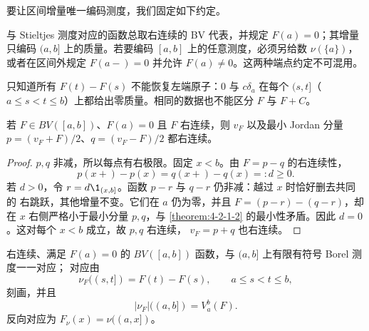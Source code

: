 要让区间增量唯一编码测度，我们固定如下约定。

\begin{definition}[右连续规范与左端原子]\label{def:4-2-1-3}
与 Stieltjes 测度对应的函数总取右连续的 BV 代表，并规定 $F(a)=0$；其增量只编码
$(a,b]$ 上的质量。若要编码 $[a,b]$ 上的任意测度，必须另给数
$\nu(\{a\})$，或者在区间外规定 $F(a-)=0$ 并允许 $F(a)\ne0$。这两种端点约定不可混用。
\end{definition}

只知道所有 $F(t)-F(s)$ 不能恢复左端原子：$0$ 与 $c\delta_a$ 在每个
$(s,t]$（$a\le s<t\le b$）上都给出零质量。相同的数据也不能区分 $F$ 与 $F+C$。

\begin{lemma}[右连续性传给变差函数]\label{lemma:4-2-1-right-variation}
若 $F\in BV([a,b])$、$F(a)=0$ 且 $F$ 右连续，则 $v_F$ 以及最小 Jordan 分量
$p=(v_F+F)/2$、$q=(v_F-F)/2$ 都右连续。
\end{lemma}

\begin{proof}
$p,q$ 非减，所以每点有右极限。固定 $x<b$。由 $F=p-q$ 的右连续性，
\[
 p(x+)-p(x)=q(x+)-q(x)=:d\ge0.
\]
若 $d>0$，令 $r=d\1_{(x,b]}$。函数 $p-r$ 与 $q-r$ 仍非减：越过 $x$ 时恰好删去共同的
右跳跃，其他增量不变。它们在 $a$ 仍为零，并且
$F=(p-r)-(q-r)$，却在 $x$ 右侧严格小于最小分量 $p,q$，与
\cref{theorem:4-2-1-2} 的最小性矛盾。因此 $d=0$。这对每个 $x<b$ 成立，故 $p,q$ 右连续，
$v_F=p+q$ 也右连续。
\end{proof}

\begin{theorem}\label{theorem:4-2-1-4}
右连续、满足 $F(a)=0$ 的 $BV([a,b])$ 函数，与 $(a,b]$ 上有限有符号 Borel 测度一一对应；
对应由
\[
 \nu_F((s,t])=F(t)-F(s),\qquad a\le s<t\le b,
\]
刻画，并且
\begin{equation}\label{eq:4-2-variation-measure}
 |\nu_F|((a,b])=V_a^b(F).
\end{equation}
反向对应为 $F_\nu(x)=\nu((a,x])$。
\end{theorem}

